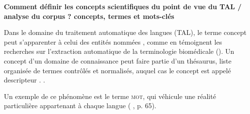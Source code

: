 
\textbf{Comment définir les concepts scientifiques du point de vue du TAL / analyse du corpus ? concepts, termes et mots-clés}







Dans le domaine du traitement automatique des langues (\textsc{TAL}), le terme \og concept \fg{} peut s'apparenter à celui des \og entités nommées \fg{}, comme en témoignent les recherches sur l'extraction automatique de la terminologie biomédicale (\citealp{jolly2024exploring,navarro2023clinical}). Un concept d'un domaine de connaissance peut faire partie d'un thésaurus, liste organisée de termes contrôlés et normalisés, auquel cas le concept est appelé \og descripteur \fg{}. \citep[p.~16]{RENNESSON202015}.

Un exemple de ce phénomène est le terme \textsc{mot}, qui véhicule une réalité particulière appartenant à chaque langue (\citeauthor{mounin1968clefs} \citeyear{mounin1968clefs}, p. 65). 

